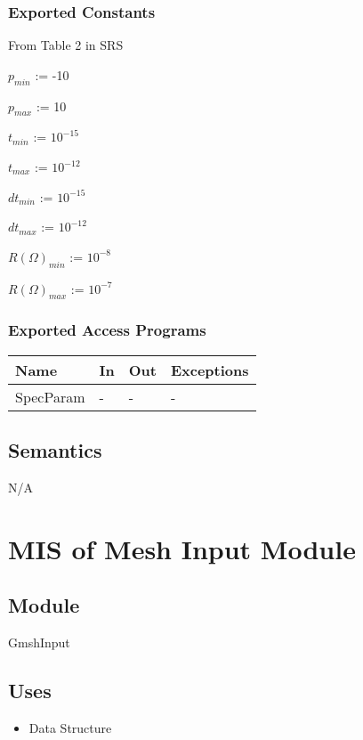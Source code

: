 \documentclass[12pt, titlepage]{article}
\begin{document}
\subsubsection{Exported Constants}

From Table 2 in SRS

$p_{min}$ := -10

$p_{max}$ := 10

$t_{min}$ := $10^{-15}$
		
$t_{max}$ := $10^{-12}$

$dt_{min}$ := $10^{-15}$

$dt_{max}$ := $10^{-12}$		

$R(\Omega)_{min}$ := $10^{-8}$

$R(\Omega)_{max}$ := $10^{-7}$


\subsubsection{Exported Access Programs}

\begin{center}
	\begin{tabular}{p{2cm} p{4cm} p{4cm} p{2cm}}
		\hline
		\textbf{Name} & \textbf{In} & \textbf{Out} & \textbf{Exceptions} \\
		\hline
		SpecParam & - & - & - \\
		\hline
	\end{tabular}
\end{center}

\subsection{Semantics}
N/A

\newpage
%
%
%
%

\section{MIS of Mesh Input Module} \label{MIM} 



\subsection{Module}
GmshInput

\subsection{Uses}
\begin{itemize}
	\item Data Structure
	
\end{itemize}
\end{document}
